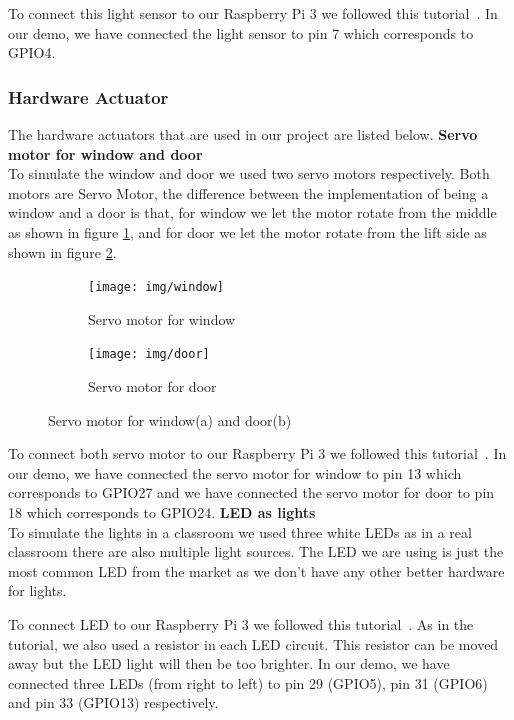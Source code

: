 \documentclass[runningheads]{llncs}
\begin{document}
To connect this light sensor to our Raspberry Pi 3 we followed this tutorial~\cite{l_tutorial}. In our demo, we have connected the light sensor to pin 7 which corresponds to GPIO4.

\subsubsection{Hardware Actuator}\hfill
\label{hard_imp:actuator}
\newline
The hardware actuators that are used in our project are listed below.
\newline
\textbf{Servo motor for window and door~\cite{m_actuator}}\\
To simulate the window and door we used two servo motors respectively. Both motors are Servo Motor, the difference between the implementation of being a window and a door is that, for window we let the motor rotate from the middle as shown in figure \ref{pic:window}, and for door we let the motor rotate from the lift side as shown in figure \ref{pic:door}. 
\begin{figure}[H]
\centering
\begin{subfigure}{.5\textwidth}
  \centering
  \texttt{[image: img/window]}
  \caption{Servo motor for window}
  \label{pic:window}
\end{subfigure}%
\begin{subfigure}{.5\textwidth}
  \centering
  \texttt{[image: img/door]}
  \caption{Servo motor for door}
  \label{pic:door}
\end{subfigure}
\caption{Servo motor for window(a) and door(b)}
\label{pic:sm}
\end{figure}

To connect both servo motor to our Raspberry Pi 3 we followed this tutorial~\cite{m_tutorial}. In our demo, we have connected the servo motor for window to pin 13 which corresponds to GPIO27 and we have connected the servo motor for door to pin 18 which corresponds to GPIO24.
\newline
\textbf{LED as lights}\\
To simulate the lights in a classroom we used three white LEDs as in a real classroom there are also multiple light sources. The LED we are using is just the most common LED from the market as we don’t have any other better hardware for lights.

To connect LED to our Raspberry Pi 3 we followed this tutorial~\cite{led_tutorial}. As in the tutorial, we also used a resistor in each LED circuit. This resistor can be moved away but the LED light will then be too brighter. In our demo, we have connected three LEDs (from right to left) to pin 29 (GPIO5), pin 31 (GPIO6) and pin 33 (GPIO13) respectively.
\end{document}
